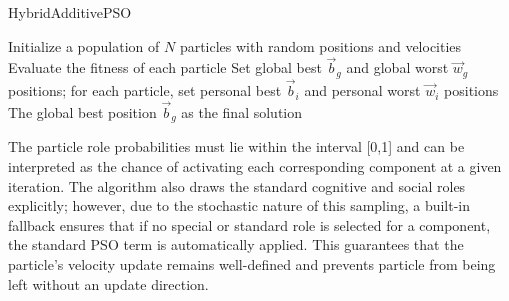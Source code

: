 {\vspace{.935em}
\begin{algorithm}[H]
\caption{HybridAdditivePSO}\label{alg:hybridadditive}
Initialize a population of \(N\) particles with random positions and velocities\;  
Evaluate the fitness of each particle\;  
Set global best \(\vec{b}_g\) and global worst \(\vec{w}_g\) positions; for each particle, set personal best \(\vec{b}_i\) and personal worst \(\vec{w}_i\) positions\;  
\Return The global best position \(\vec{b}_g\) as the final solution \;
\end{algorithm}
\vspace{.935em}




The particle role probabilities must lie within the interval [0,1] and can be interpreted as the chance of activating each corresponding component at a given iteration. The algorithm also draws the standard cognitive and social roles explicitly; however, due to the stochastic nature of this sampling, a built-in fallback ensures that if no special or standard role is selected for a component, the standard PSO term is automatically applied. This guarantees that the particle’s velocity update remains well-defined and prevents particle from being left without an update direction.








}
